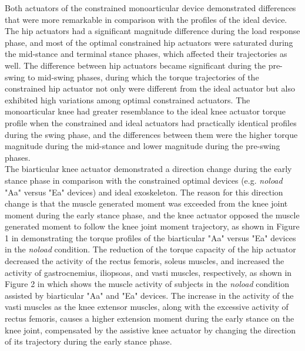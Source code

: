 \documentclass[10pt,letterpaper]{article}
\begin{document}
Both actuators of the constrained monoarticular device demonstrated differences that were more remarkable in comparison with the profiles of the ideal device. The hip actuators had a significant magnitude difference during the load response phase, and most of the optimal constrained hip actuators were saturated during the mid-stance and terminal stance phases, which affected their trajectories as well. The difference between hip actuators became significant during the pre-swing to mid-swing phases, during which the torque trajectories of the constrained hip actuator not only were different from the ideal actuator but also exhibited high variations among optimal constrained actuators. The monoarticular knee had greater resemblance to the ideal knee actuator torque profile when the constrained and ideal actuators had practically identical profiles during the swing phase, and the differences between them were the higher torque magnitude during the mid-stance and lower magnitude during the pre-swing phases.\\
The biarticular knee actuator demonstrated a direction change during the early stance phase in comparison with the constrained optimal devices (e.g. {\it noload} "Aa" versus "Ea" devices) and ideal exoskeleton. The reason for this direction change is that the muscle generated moment was exceeded from the knee joint moment during the early stance phase, and the knee actuator opposed the muscle generated moment to follow the knee joint moment trajectory, as shown in Figure 1 in  demonstrating the torque profiles of the biarticular "Aa" versus "Ea" devices in the {\it noload} condition. The reduction of the torque capacity of the hip actuator decreased the activity of the rectus femoris, soleus muscles, and increased the activity of gastrocnemius, iliopsoas, and vasti muscles, respectively, as shown in Figure 2 in  which shows the muscle activity of subjects in the {\it noload} condition assisted by biarticular "Aa" and "Ea" devices. The increase in the activity of the vasti muscles as the knee extensor muscles, along with the excessive activity of rectus femoris, causes a higher extension moment during the early stance on the knee joint, compensated by the assistive knee actuator by changing the direction of its trajectory during the early stance phase.\\
\end{document}
